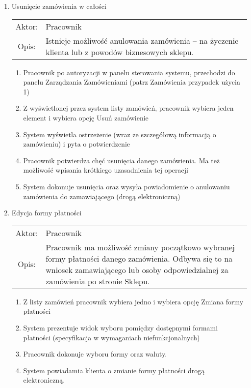 \begin{enumerate}
  \item Usunięcie zamówienia w całości\\
  \begin{tabularx}{\linewidth}{c X}
  Aktor: & Pracownik \\
  Opis: & Istnieje możliwość anulowania zamówienia – na życzenie klienta lub z
  powodów biznesowych sklepu.
  \end{tabularx}  
	\begin{enumerate}
	  \item Pracownik po autoryzacji w panelu sterowania systemu, przechodzi do
	  panelu Zarządzania Zamówieniami (patrz Zamówienia przypadek użycia 1)
	  \item Z wyświetlonej przez system listy zamówień, pracownik wybiera jeden
	  element i wybiera opcję Usuń zamówienie
	  \item System wyświetla ostrzeżenie (wraz ze szczegółową informacją o
	  zamówieniu) i pyta o potwierdzenie
	  \item Pracownik potwierdza chęć usunięcia danego zamówienia. Ma też możliwość
	  wpisania krótkiego uzasadnienia tej operacji
	  \item System dokonuje usunięcia oraz wysyła powiadomienie o anulowaniu
	  zamówienia do zamawiającego (drogą elektroniczną)
	\end{enumerate}

  \item Edycja formy płatności\\
  \begin{tabularx}{\linewidth}{c X}
  Aktor: & Pracownik \\
  Opis: & Pracownik ma możliwość zmiany początkowo wybranej formy płatności
  danego zamówienia. Odbywa się to na wniosek zamawiającego lub osoby
  odpowiedzialnej za zamówienia po stronie Sklepu.
  \end{tabularx}    
	\begin{enumerate}
	  \item Z listy zamówień pracownik wybiera jedno i wybiera opcję Zmiana formy
	  płatności
	  \item System prezentuje widok wyboru pomiędzy dostępnymi formami płatności
	  (specyfikacja w wymaganiach niefunkcjonalnych)
	  \item Pracownik dokonuje wyboru formy oraz waluty.
	  \item System powiadamia klienta o zmianie formy płatności drogą elektroniczną.
	\end{enumerate}


\end{enumerate}
